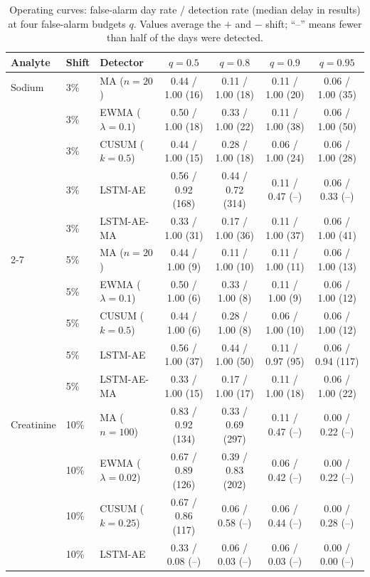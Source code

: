 \documentclass[conference]{IEEEtran}
\begin{document}
\begin{table}[!t]
\centering
\renewcommand{\arraystretch}{1.15}
\setlength{\tabcolsep}{5pt}
\caption{Operating curves: false-alarm day rate / detection rate (median delay in results) at four false-alarm budgets $q$. Values average the $+$ and $-$ shift; ``--'' means fewer than half of the days were detected.}
\label{tab:sweep}
\begin{tabular}{lll cccc}
\toprule
\textbf{Analyte} & \textbf{Shift} & \textbf{Detector} & $q{=}0.5$ & $q{=}0.8$ & $q{=}0.9$ & $q{=}0.95$ \\
\midrule
Sodium & 3\% & MA ($n{=}20$) & 0.44 / 1.00 (16) & 0.11 / 1.00 (18) & 0.11 / 1.00 (20) & 0.06 / 1.00 (35) \\
 & 3\% & EWMA ($\lambda{=}0.1$) & 0.50 / 1.00 (18) & 0.33 / 1.00 (22) & 0.11 / 1.00 (38) & 0.06 / 1.00 (50) \\
 & 3\% & CUSUM ($k{=}0.5$) & 0.44 / 1.00 (15) & 0.28 / 1.00 (18) & 0.06 / 1.00 (24) & 0.06 / 1.00 (28) \\
 & 3\% & LSTM-AE & 0.56 / 0.92 (168) & 0.44 / 0.72 (314) & 0.11 / 0.47 (--) & 0.06 / 0.33 (--) \\
 & 3\% & LSTM-AE-MA & 0.33 / 1.00 (31) & 0.17 / 1.00 (36) & 0.11 / 1.00 (37) & 0.06 / 1.00 (41) \\
\cmidrule(lr){2-7}
 & 5\% & MA ($n{=}20$) & 0.44 / 1.00 (9) & 0.11 / 1.00 (10) & 0.11 / 1.00 (11) & 0.06 / 1.00 (13) \\
 & 5\% & EWMA ($\lambda{=}0.1$) & 0.50 / 1.00 (6) & 0.33 / 1.00 (8) & 0.11 / 1.00 (9) & 0.06 / 1.00 (12) \\
 & 5\% & CUSUM ($k{=}0.5$) & 0.44 / 1.00 (6) & 0.28 / 1.00 (8) & 0.06 / 1.00 (10) & 0.06 / 1.00 (12) \\
 & 5\% & LSTM-AE & 0.56 / 1.00 (37) & 0.44 / 1.00 (50) & 0.11 / 0.97 (95) & 0.06 / 0.94 (117) \\
 & 5\% & LSTM-AE-MA & 0.33 / 1.00 (15) & 0.17 / 1.00 (17) & 0.11 / 1.00 (18) & 0.06 / 1.00 (22) \\
\midrule
Creatinine & 10\% & MA ($n{=}100$) & 0.83 / 0.92 (134) & 0.33 / 0.69 (297) & 0.11 / 0.47 (--) & 0.00 / 0.22 (--) \\
 & 10\% & EWMA ($\lambda{=}0.02$) & 0.67 / 0.89 (126) & 0.39 / 0.83 (202) & 0.06 / 0.42 (--) & 0.00 / 0.22 (--) \\
 & 10\% & CUSUM ($k{=}0.25$) & 0.67 / 0.86 (117) & 0.06 / 0.58 (--) & 0.06 / 0.44 (--) & 0.00 / 0.28 (--) \\
 & 10\% & LSTM-AE & 0.33 / 0.08 (--) & 0.06 / 0.03 (--) & 0.06 / 0.03 (--) & 0.00 / 0.00 (--) \\

\end{tabular}
\end{table}
\end{document}
